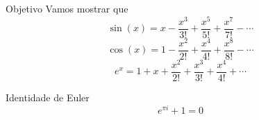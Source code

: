 \begin{frame}{Objetivo}
  Vamos mostrar que
  \pause
  \[
    \sin(x) = x - \frac{x^3}{3!} + \frac{x^5}{5!} + \frac{x^7}{7!} - \cdots
  \]
  \pause
  \[
    \cos(x) = 1 - \frac{x^2}{2!} + \frac{x^4}{4!} + \frac{x^8}{8!} - \cdots
  \]
  \pause
  \[
    e^x = 1 + x + \frac{x^2}{2!} + \frac{x^3}{3!} + \frac{x^4}{4!} +  \cdots
  \]
\end{frame}

\begin{frame}{Identidade de Euler}
  \Huge
  \[
    e^{\pi i} + 1 = 0
  \]
\end{frame}



